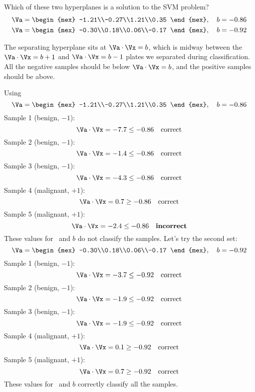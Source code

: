 \documentclass[12pt]{pajarticle}
\begin{document}
\begin{question}{5}{
Which of these two hyperplanes is a solution to the SVM problem?
\begin{align*}
		\Va &= \begin{mex} -1.21\\-0.27\\1.21\\0.35 \end{mex},\quad b=-0.86 \\
		\Va &= \begin{mex} -0.30\\0.18\\0.06\\-0.17 \end{mex},\quad b=-0.92
\end{align*}
}{
The separating hyperplane sits at $\Va\cdot\Vx=b$, which is midway between the $\Va\cdot\Vx=b+1$ and $\Va\cdot\Vx=b-1$ plates we separated during classification. All the negative samples should be below $\Va\cdot\Vx=b$, and the positive samples should be above.

Using 
\[ \Va = \begin{mex} -1.21\\-0.27\\1.21\\0.35 \end{mex},\quad b=-0.86 \]
Sample 1 (benign, $-1$):
\[ \Va\cdot\Vx = -7.7 \le -0.86 \quad\text{correct} \]
Sample 2 (benign, $-1$):
\[ \Va\cdot\Vx = -1.4 \le -0.86 \quad\text{correct} \]
Sample 3 (benign, $-1$):
\[ \Va\cdot\Vx = -4.3 \le -0.86 \quad\text{correct} \]
Sample 4 (malignant, $+1$):
\[ \Va\cdot\Vx = 0.7 \ge -0.86 \quad\text{correct} \]
Sample 5 (malignant, $+1$):
\[ \Va\cdot\Vx = -2.4 \le -0.86 \quad\text{\bf incorrect} \]
These values for \Va\ and $b$ do not classify the samples. Let's try the second set: 
\[ \Va = \begin{mex} -0.30\\0.18\\0.06\\-0.17 \end{mex},\quad b=-0.92 \]
Sample 1 (benign, $-1$):
\[ \Va\cdot\Vx = -3.7 \le -0.92 \quad\text{correct} \]
Sample 2 (benign, $-1$):
\[ \Va\cdot\Vx = -1.9 \le -0.92 \quad\text{correct} \]
Sample 3 (benign, $-1$):
\[ \Va\cdot\Vx = -1.9 \le -0.92 \quad\text{correct} \]
Sample 4 (malignant, $+1$):
\[ \Va\cdot\Vx = 0.1 \ge -0.92 \quad\text{correct} \]
Sample 5 (malignant, $+1$):
\[ \Va\cdot\Vx = 0.7 \ge -0.92 \quad\text{correct} \]
These values for \Va\ and $b$ correctly classify all the samples.
}
\end{question}
\end{document}

